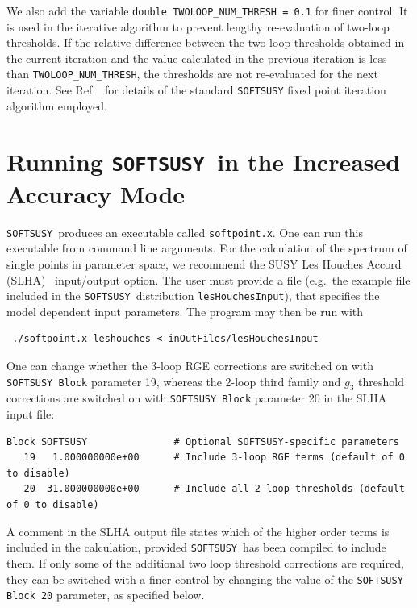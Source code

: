 \documentclass[final,3p,times,pdflatex]{elsarticle}
\def\SOFTSUSY{{\tt SOFTSUSY}}
\def\code#1{{\tt #1}}
\begin{document}
We also add the variable
\verb|double TWOLOOP_NUM_THRESH = 0.1| for finer control. It is 
          used in the iterative 
          algorithm to prevent lengthy re-evaluation of two-loop thresholds.
          If the relative difference between the two-loop thresholds obtained
          in the 
          current iteration and the value calculated in the previous
          iteration is less than
          \verb|TWOLOOP_NUM_THRESH|, the thresholds are not 
          re-evaluated for
          the next iteration.  
          See Ref.~\cite{Allanach:2001kg} for
          details of the standard {\tt SOFTSUSY} fixed point iteration 
          algorithm employed.
        
\section{Running \SOFTSUSY~in the Increased Accuracy Mode}  
\label{sec:run}

\SOFTSUSY~produces an executable called \code{softpoint.x}. 
One can run this executable from command line arguments. 
For the calculation
of the spectrum of single points in parameter space, we recommend the
SUSY Les Houches Accord (SLHA)~\cite{Skands:2003cj} input/output
option. The user must provide a file (e.g.\ the example file included
in the \SOFTSUSY~distribution
\code{lesHouchesInput}), that specifies the model dependent input
parameters. The program may then be run with
\small
\begin{verbatim}
 ./softpoint.x leshouches < inOutFiles/lesHouchesInput
\end{verbatim}
\normalsize

One can change whether the 3-loop RGE corrections are switched on with
\code{SOFTSUSY Block} parameter 19, whereas the 2-loop third family and $g_3$
threshold corrections 
are switched on with \code{SOFTSUSY Block} parameter 20 in the SLHA input file:
\begin{verbatim}
Block SOFTSUSY               # Optional SOFTSUSY-specific parameters
   19   1.000000000e+00      # Include 3-loop RGE terms (default of 0 to disable)
   20  31.000000000e+00      # Include all 2-loop thresholds (default of 0 to disable)
\end{verbatim}
A comment in the SLHA output file states which of the higher order terms is
included in the calculation, provided {\tt SOFTSUSY}~has been compiled to
include them. If only some of the additional two loop threshold corrections
are required, they can be switched with a finer control by changing the value
of the {\tt SOFTSUSY Block 20} parameter, as specified below.
\end{document}
